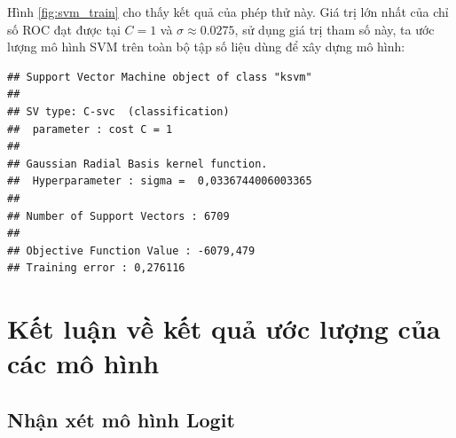 \documentclass[a4paper]{report}\usepackage[]{graphicx}\usepackage[]{color}
\makeatletter
\newenvironment{kframe}{%
 \def\at@end@of@kframe{}%
 \ifinner\ifhmode%
  \def\at@end@of@kframe{\end{minipage}}%
  \begin{minipage}{\columnwidth}%
 \fi\fi%
 \def\FrameCommand##1{\hskip\@totalleftmargin \hskip-\fboxsep
 \colorbox{shadecolor}{##1}\hskip-\fboxsep
     \hskip-\linewidth \hskip-\@totalleftmargin \hskip\columnwidth}%
 \MakeFramed {\advance\hsize-\width
   \@totalleftmargin\z@ \linewidth\hsize
   \@setminipage}}%
 {\par\unskip\endMakeFramed%
 \at@end@of@kframe}
\newenvironment{knitrout}{}{} %
\makeatother
\begin{document}
Hình \ref{fig:svm_train} cho thấy kết quả của phép thử này.  Giá trị lớn nhất của chỉ số ROC đạt được tại $C = 1$ và $\sigma \approx 0.0275$, sử dụng giá trị tham số này, ta ước lượng mô hình SVM trên toàn bộ tập số liệu dùng để xây dựng mô hình:

\begin{knitrout}\small
{}\color{fgcolor}\begin{kframe}
\begin{verbatim}
## Support Vector Machine object of class "ksvm" 
## 
## SV type: C-svc  (classification) 
##  parameter : cost C = 1 
## 
## Gaussian Radial Basis kernel function. 
##  Hyperparameter : sigma =  0,0336744006003365 
## 
## Number of Support Vectors : 6709 
## 
## Objective Function Value : -6079,479 
## Training error : 0,276116
\end{verbatim}
\end{kframe}
\end{knitrout}



\section{Kết luận về kết quả ước lượng của các mô hình}

\subsection{Nhận xét mô hình Logit}



\end{document}
